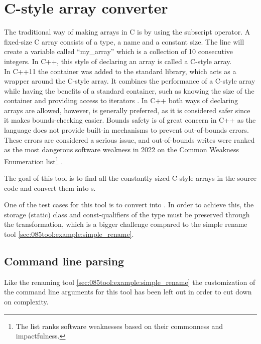 
\section{C-style array converter}\label{sec:045tool:c_style_array}

The traditional way of making arrays in C is by using the subscript operator. A fixed-size C array consists of a type, a name and a constant size. The line  will create a variable called ``my\_array'' which is a collection of 10 consecutive integers.
In C++, this style of declaring an array is called a C-style array.\\
In C++11 the container  was added to the standard library, which acts as a wrapper around the C-style array.
It combines the performance of a C-style array while having the benefits of a standard container, such as knowing the size of the container and providing access to iterators \cite{cppreferenceStdArrayCppreference}.
In C++ both ways of declaring arrays are allowed, however,  is generally preferred, as it is considered safer since it makes bounds-checking easier.
Bounds safety is of great concern in C++ as the language does not provide built-in mechanisms to prevent out-of-bounds errors.
These errors are considered a serious issue, and out-of-bounds writes were ranked as the most dangerous software weakness in 2022 on the Common Weakness Enumeration list\footnote{The list ranks software weaknesses based on their commonness and impactfulness.} \cite{mitreCWE2022CWE}.

The goal of this tool is to find all the constantly sized C-style arrays in the source code and convert them into s.

One of the test cases for this tool is to convert  into . In order to achieve this, the storage (static) class and const-qualifiers of the type must be preserved through the transformation, which is a bigger challenge compared to the simple rename tool \cref{sec:085tool:example:simple_rename}.

\subsection{Command line parsing}

Like the renaming tool \cref{sec:085tool:example:simple_rename} the customization of the command line arguments for this tool has been left out in order to cut down on complexity.

